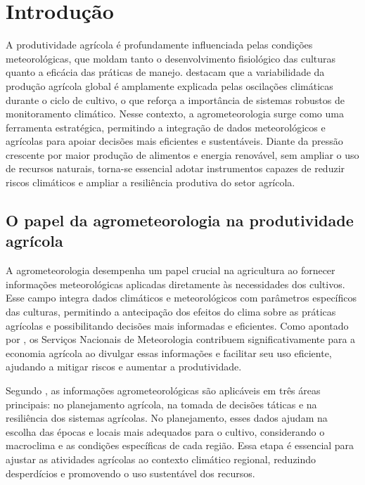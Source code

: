 \documentclass[
	12pt,				%
	openright,			%
	oneside,			%
	a4paper,			%
	english,			%
	french,				%
	spanish,			%
	brazil				%
	]{abntex2}
\begin{document}
\chapter{Introdução}
\label{cap:introducao}

A produtividade agrícola é profundamente influenciada pelas condições meteorológicas, que moldam tanto o desenvolvimento fisiológico das culturas quanto a eficácia das práticas de manejo.  destacam que a variabilidade da produção agrícola global é amplamente explicada pelas oscilações climáticas durante o ciclo de cultivo, o que reforça a importância de sistemas robustos de monitoramento climático. Nesse contexto, a agrometeorologia surge como uma ferramenta estratégica, permitindo a integração de dados meteorológicos e agrícolas para apoiar decisões mais eficientes e sustentáveis. Diante da pressão crescente por maior produção de alimentos e energia renovável, sem ampliar o uso de recursos naturais, torna-se essencial adotar instrumentos capazes de reduzir riscos climáticos e ampliar a resiliência produtiva do setor agrícola.

\section{O papel da agrometeorologia na produtividade agrícola}

A agrometeorologia desempenha um papel crucial na agricultura ao fornecer informações meteorológicas aplicadas diretamente às necessidades dos cultivos. Esse campo integra dados climáticos e meteorológicos com parâmetros específicos das culturas, permitindo a antecipação dos efeitos do clima sobre as práticas agrícolas e possibilitando decisões mais informadas e eficientes. Como apontado por , os Serviços Nacionais de Meteorologia contribuem significativamente para a economia agrícola ao divulgar essas informações e facilitar seu uso eficiente, ajudando a mitigar riscos e aumentar a produtividade.

Segundo , as informações agrometeorológicas são aplicáveis em três áreas principais: no planejamento agrícola, na tomada de decisões táticas e na resiliência dos sistemas agrícolas. No planejamento, esses dados ajudam na escolha das épocas e locais mais adequados para o cultivo, considerando o macroclima e as condições específicas de cada região. Essa etapa é essencial para ajustar as atividades agrícolas ao contexto climático regional, reduzindo desperdícios e promovendo o uso sustentável dos recursos.
\end{document}
